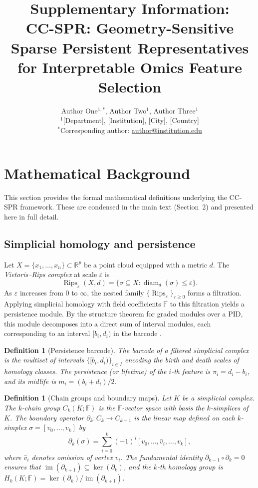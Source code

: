 \documentclass[11pt]{article}
\title{Supplementary Information:\\
CC-SPR: Geometry-Sensitive Sparse Persistent Representatives\\
for Interpretable Omics Feature Selection}
\author{Author One$^{1,\ast}$, Author Two$^{1}$, Author Three$^{1}$\\[4pt]
\small $^{1}$[Department], [Institution], [City], [Country]\\
\small $^\ast$Corresponding author: \href{mailto:author@institution.edu}{author@institution.edu}}
\date{}
\newtheorem{definition}[theorem]{Definition}
\DeclareMathOperator{\Rips}{Rips}
\DeclareMathOperator{\diam}{diam}
\begin{document}
\maketitle

\tableofcontents
\newpage

\section{Mathematical Background}
\label{sec:supp_background}

This section provides the formal mathematical definitions underlying the CC-SPR framework.
These are condensed in the main text (Section~2) and presented here in full detail.

\subsection{Simplicial homology and persistence}

Let $X = \{x_1, \ldots, x_n\} \subset \mathbb{R}^p$ be a point cloud equipped with a metric $d$.
The \emph{Vietoris--Rips complex} at scale $\varepsilon$ is
\[
\Rips_\varepsilon(X, d) = \bigl\{ \sigma \subseteq X : \diam_d(\sigma) \le \varepsilon \bigr\}.
\]
As $\varepsilon$ increases from $0$ to $\infty$, the nested family $\{\Rips_\varepsilon\}_{\varepsilon \ge 0}$ forms a filtration.
Applying simplicial homology with field coefficients $\mathbb{F}$ to this filtration yields a persistence module.
By the structure theorem for graded modules over a PID, this module decomposes into a direct sum of interval modules, each corresponding to an interval $[b_i, d_i)$ in the barcode \cite{zomorodian2005}.

\begin{definition}[Persistence barcode]\label{def:supp_barcode}
The \emph{barcode} of a filtered simplicial complex is the multiset of intervals $\{[b_i, d_i)\}_{i \in I}$ encoding the birth and death scales of homology classes.
The \emph{persistence} (or \emph{lifetime}) of the $i$-th feature is $\pi_i = d_i - b_i$, and its \emph{midlife} is $m_i = (b_i + d_i)/2$.
\end{definition}

\begin{definition}[Chain groups and boundary maps]\label{def:supp_chains}
Let $K$ be a simplicial complex.
The \emph{$k$-chain group} $C_k(K; \mathbb{F})$ is the $\mathbb{F}$-vector space with basis the $k$-simplices of $K$.
The \emph{boundary operator} $\partial_k: C_k \to C_{k-1}$ is the linear map defined on each $k$-simplex $\sigma = [v_0, \ldots, v_k]$ by
\[
\partial_k(\sigma) = \sum_{i=0}^k (-1)^i [v_0, \ldots, \hat{v}_i, \ldots, v_k],
\]
where $\hat{v}_i$ denotes omission of vertex $v_i$.
The fundamental identity $\partial_{k-1} \circ \partial_k = 0$ ensures that $\operatorname{im}(\partial_{k+1}) \subseteq \ker(\partial_k)$, and the $k$-th homology group is $H_k(K; \mathbb{F}) = \ker(\partial_k) / \operatorname{im}(\partial_{k+1})$.
\end{definition}
\end{document}
